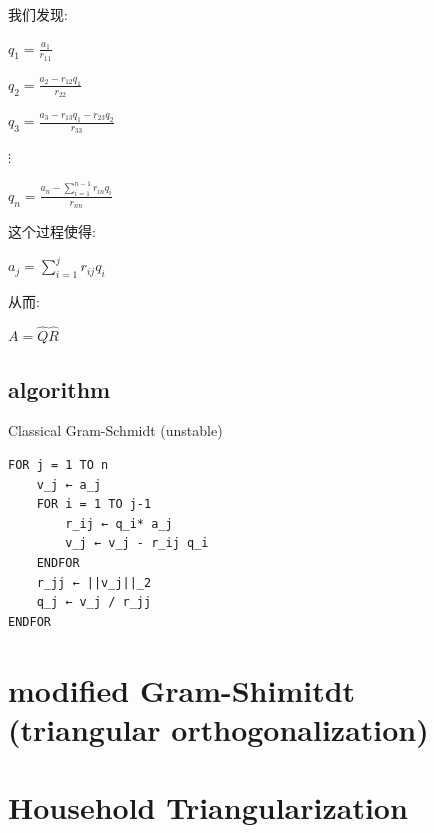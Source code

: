 我们发现:

\(q_{1} = \frac{a_{1}}{r_{11}}\)

\(q_{2} = \frac{a_{2} - r_{12}q_{1}}{r_{22}}\)

\(q_{3} = \frac{a_{3} - r_{13}q_{1} - r_{23}q_{2}}{r_{33}}\)

\(\vdots\)

\(q_{n} = \frac{a_{n} - \sum_{i = 1}^{n - 1}r_{in}q_{i}}{r_{nn}}\)

这个过程使得:

\(a_{j} = \sum_{i = 1}^{j}r_{ij}q_{i}\)

从而:

\(A = \widehat{Q}\widehat{R}\)

\subsection{algorithm}

Classical Gram-Schmidt (unstable)

\begin{verbatim}
FOR j = 1 TO n
    v_j ← a_j
    FOR i = 1 TO j-1
        r_ij ← q_i* a_j
        v_j ← v_j - r_ij q_i
    ENDFOR
    r_jj ← ||v_j||_2
    q_j ← v_j / r_jj
ENDFOR
\end{verbatim}

\section{modified Gram-Shimitdt (triangular orthogonalization)}

\section{Household Triangularization}
